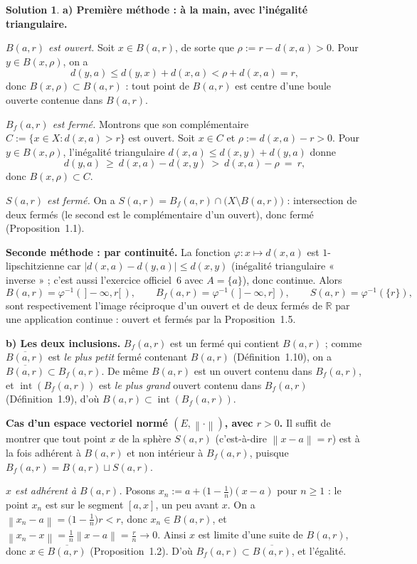\documentclass[11pt,a4paper]{article}
\newcommand{\R}{\mathbb{R}}
\newcommand{\adh}[1]{\overline{#1}}
\newcommand{\Int}{\operatorname{int}}
\newcommand{\Bf}{B_f}
\newcommand{\norm}[1]{\left\|#1\right\|}
\newcommand{\ie}{c'est-à-dire}
\theoremstyle{definition}
\newtheorem*{solution}{Solution}
\begin{document}
\begin{solution}
\noindent\textbf{a) Première méthode : à la main, avec l'inégalité triangulaire.}

\emph{$B(a,r)$ est ouvert.} Soit $x\in B(a,r)$, de sorte que $\rho := r-d(x,a)>0$. Pour $y\in B(x,\rho)$, on a
\[
d(y,a)\le d(y,x)+d(x,a) < \rho + d(x,a) = r,
\]
donc $B(x,\rho)\subset B(a,r)$ : tout point de $B(a,r)$ est centre d'une boule ouverte contenue dans $B(a,r)$.

\emph{$\Bf(a,r)$ est fermé.} Montrons que son complémentaire $C:=\{x\in X : d(x,a)>r\}$ est ouvert. Soit $x\in C$ et $\rho := d(x,a)-r>0$. Pour $y\in B(x,\rho)$, l'inégalité triangulaire $d(x,a)\le d(x,y)+d(y,a)$ donne
\[
d(y,a)\ \ge\ d(x,a)-d(x,y)\ >\ d(x,a)-\rho\ =\ r,
\]
donc $B(x,\rho)\subset C$.

\emph{$S(a,r)$ est fermé.} On a $S(a,r)=\Bf(a,r)\cap\big(X\setminus B(a,r)\big)$ : intersection de deux fermés (le second est le complémentaire d'un ouvert), donc fermé (Proposition~1.1).

\medskip
\noindent\textbf{Seconde méthode : par continuité.} La fonction $\varphi : x\mapsto d(x,a)$ est $1$-lipschitzienne car $|d(x,a)-d(y,a)|\le d(x,y)$ (inégalité triangulaire « inverse » ; c'est aussi l'exercice officiel~6 avec $A=\{a\}$), donc continue. Alors
\[
B(a,r)=\varphi^{-1}(\,]-\infty,r[\,),\qquad \Bf(a,r)=\varphi^{-1}(\,]-\infty,r]\,),\qquad S(a,r)=\varphi^{-1}(\{r\}),
\]
sont respectivement l'image réciproque d'un ouvert et de deux fermés de $\R$ par une application continue : ouvert et fermés par la Proposition~1.5.

\medskip
\noindent\textbf{b) Les deux inclusions.} $\Bf(a,r)$ est un fermé qui contient $B(a,r)$ ; comme $\adh{B(a,r)}$ est \emph{le plus petit} fermé contenant $B(a,r)$ (Définition~1.10), on a $\adh{B(a,r)}\subset\Bf(a,r)$. De même $B(a,r)$ est un ouvert contenu dans $\Bf(a,r)$, et $\Int(\Bf(a,r))$ est \emph{le plus grand} ouvert contenu dans $\Bf(a,r)$ (Définition~1.9), d'où $B(a,r)\subset\Int(\Bf(a,r))$.

\medskip
\noindent\textbf{Cas d'un espace vectoriel normé $(E,\norm{\cdot})$, avec $r>0$.} Il suffit de montrer que tout point $x$ de la sphère $S(a,r)$ (\ie{} $\norm{x-a}=r$) est à la fois adhérent à $B(a,r)$ et non intérieur à $\Bf(a,r)$, puisque $\Bf(a,r)=B(a,r)\sqcup S(a,r)$.

\emph{$x$ est adhérent à $B(a,r)$.} Posons $x_n := a+\big(1-\tfrac1n\big)(x-a)$ pour $n\ge1$ : le point $x_n$ est sur le segment $[a,x]$, un peu avant $x$. On a $\norm{x_n-a}=\big(1-\tfrac1n\big)r<r$, donc $x_n\in B(a,r)$, et $\norm{x_n-x}=\tfrac1n\norm{x-a}=\tfrac rn\to0$. Ainsi $x$ est limite d'une suite de $B(a,r)$, donc $x\in\adh{B(a,r)}$ (Proposition~1.2). D'où $\Bf(a,r)\subset\adh{B(a,r)}$, et l'égalité.


\end{solution}
\end{document}
